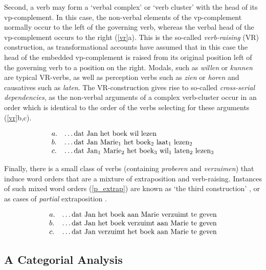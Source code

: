 Second, a verb may form a `verbal complex' or `verb cluster' with the head of 
its
{\sc vp}-complement.  In this case, the non-verbal elements of the {\sc
vp}-complement normally occur to the left of the governing verb, whereas the
verbal head of the {\sc vp}-complement occurs to the right (\ref{vr}a).  This is
the so-called {\em verb-raising} (VR) construction, as transformational accounts
have assumed that in this case the head of the embedded {\sc vp}-complement is
raised from its original position left of the governing verb to a position on 
the
right.  Modals, such as {\em willen} or {\em kunnen} are typical VR-verbs, as 
well
as perception verbs such as {\em zien} or {\em horen} and causatives such as 
{\em
laten}.  The VR-construction gives rise to so-called {\em cross-serial
dependencies}, as the non-verbal arguments of a complex verb-cluster occur in an
order which is identical to the order of the verbs selecting for these arguments
(\ref{vr}b,c).


\begin{equation}
\label{vr}
\begin{array}[t]{ll}
a. & \mbox{\ldots dat Jan het boek wil lezen} \\
b.& \mbox{\ldots dat Jan Marie$_1$ het boek$_2$ laat$_1$ lezen$_2$} \\
c. & \mbox{\ldots dat Jan$_1$ Marie$_2$ het boek$_3$ wil$_1$ laten$_2$ 
lezen$_3$}
\end{array}
\end{equation}

Finally, there is a small class of verbs (containing {\em proberen} and {\em 
verzuimen}) that induce word orders that are a mixture of extraposition and 
verb-raising. Instances of such mixed word orders (\ref{p_extrap}) are known as 
`the 
third construction' \cite{denBestenRutten89}, or as cases of  
{\em partial} extraposition \cite{hoeksema-ms}. 

\begin{equation}
\label{p_extrap}
\begin{array}[t]{ll}
a. & \mbox{\ldots dat Jan het boek aan Marie verzuimt te geven} \\
b.& \mbox{\ldots dat Jan het boek verzuimt aan Marie  te geven} \\
c. & \mbox{\ldots dat Jan verzuimt het boek aan Marie te geven} \\
\end{array}
\end{equation}


\subsection{A Categorial Analysis}

